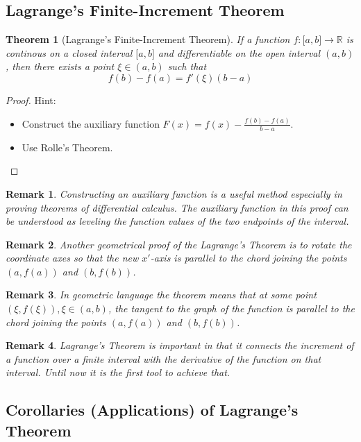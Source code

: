 \documentclass[onecolumn]{ctexart}
\newtheorem{theorem}{Theorem}
\newtheorem{remark}{Remark}
\begin{document}
\subsection{Lagrange's Finite-Increment Theorem}

\begin{theorem}[Lagrange's Finite-Increment Theorem]
  If a function $f: \lbrack a,b \rbrack \to \mathbb{R}$ is continous on a closed 
  interval $\lbrack a,b \rbrack$ and differentiable on the open interval 
  $(a, b)$, then there exists a point $\xi \in (a, b)$ such that
  \begin{equation}
    f(b) - f(a) = f'(\xi)(b - a)
  \end{equation} 
\end{theorem}
\begin{proof}
  Hint:
  \begin{itemize}
    \item Construct the auxiliary function $F(x) = f(x) - 
    \frac{f(b) - f(a)}{b - a}$.
    \item Use Rolle's Theorem.
  \end{itemize}
\end{proof}
\begin{remark}
  Constructing an auxiliary function is a useful method especially in proving 
  theorems of differential calculus. The auxiliary function in this proof can 
  be understood as leveling the function values of the two endpoints of the 
  interval.
\end{remark}
\begin{remark}
  Another geometrical proof of the Lagrange's Theorem is to rotate the 
  coordinate axes so that the new $x'$-axis is parallel to the chord joining the 
  points $(a, f(a))$ and $(b, f(b))$.
\end{remark}
\begin{remark}
  In geometric language the theorem means that at some point $(\xi, f(\xi)), 
  \xi \in (a, b)$, the tangent to the graph of the function is parallel to the 
  chord joining the points $(a, f(a))$ and $(b, f(b))$.
\end{remark}
\begin{remark}
  Lagrange's Theorem is important in that it connects the increment of a 
  function over a finite interval with the derivative of the function on that 
  interval. Until now it is the first tool to achieve that.
\end{remark}

\subsection{Corollaries (Applications) of Lagrange's Theorem}
\end{document}
